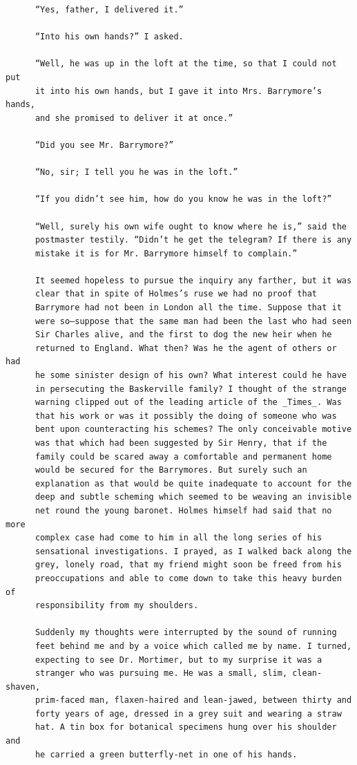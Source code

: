 \documentclass{article}
\begin{document}
\begin{verbatim}
      “Yes, father, I delivered it.”

      “Into his own hands?” I asked.

      “Well, he was up in the loft at the time, so that I could not put
      it into his own hands, but I gave it into Mrs. Barrymore’s hands,
      and she promised to deliver it at once.”

      “Did you see Mr. Barrymore?”

      “No, sir; I tell you he was in the loft.”

      “If you didn’t see him, how do you know he was in the loft?”

      “Well, surely his own wife ought to know where he is,” said the
      postmaster testily. “Didn’t he get the telegram? If there is any
      mistake it is for Mr. Barrymore himself to complain.”

      It seemed hopeless to pursue the inquiry any farther, but it was
      clear that in spite of Holmes’s ruse we had no proof that
      Barrymore had not been in London all the time. Suppose that it
      were so—suppose that the same man had been the last who had seen
      Sir Charles alive, and the first to dog the new heir when he
      returned to England. What then? Was he the agent of others or had
      he some sinister design of his own? What interest could he have
      in persecuting the Baskerville family? I thought of the strange
      warning clipped out of the leading article of the _Times_. Was
      that his work or was it possibly the doing of someone who was
      bent upon counteracting his schemes? The only conceivable motive
      was that which had been suggested by Sir Henry, that if the
      family could be scared away a comfortable and permanent home
      would be secured for the Barrymores. But surely such an
      explanation as that would be quite inadequate to account for the
      deep and subtle scheming which seemed to be weaving an invisible
      net round the young baronet. Holmes himself had said that no more
      complex case had come to him in all the long series of his
      sensational investigations. I prayed, as I walked back along the
      grey, lonely road, that my friend might soon be freed from his
      preoccupations and able to come down to take this heavy burden of
      responsibility from my shoulders.

      Suddenly my thoughts were interrupted by the sound of running
      feet behind me and by a voice which called me by name. I turned,
      expecting to see Dr. Mortimer, but to my surprise it was a
      stranger who was pursuing me. He was a small, slim, clean-shaven,
      prim-faced man, flaxen-haired and lean-jawed, between thirty and
      forty years of age, dressed in a grey suit and wearing a straw
      hat. A tin box for botanical specimens hung over his shoulder and
      he carried a green butterfly-net in one of his hands.


\end{verbatim}
\end{document}
